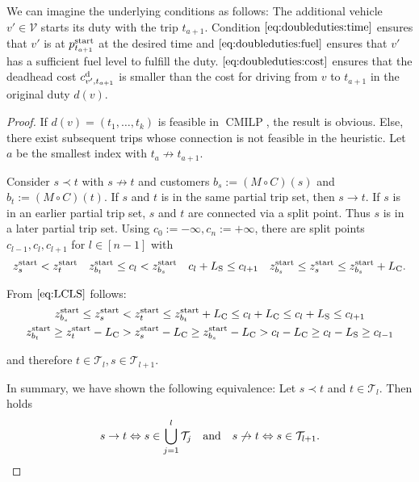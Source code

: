 We can imagine the underlying conditions as follows: The additional vehicle $v'\in\mathcal{V}$ starts its duty with the trip $t_{a+1}$. Condition $\eqref{eq:doubleduties:time}$ ensures that $v'$ is at $p^{\operatorname{start}}_{t_{a+1}}$ at the desired time and $\eqref{eq:doubleduties:fuel}$ ensures that $v'$ has a sufficient fuel level to fulfill the duty. $\eqref{eq:doubleduties:cost}$ ensures that the deadhead cost $c^{\operatorname{d}}_{v',t_{a+1}}$ is smaller than the cost for driving from $v$ to $t_{a+1}$ in the original duty $d(v)$.

\begin{proof}

If ${d(v)=\left(t_1,\dots,t_k\right)}$ is feasible in $\operatorname{CMILP}$, the result is obvious. Else, there exist subsequent trips whose connection is not feasible in the heuristic. Let $a$ be the smallest index with ${t_a\not\to t_{a+1}}$.

Consider ${s\prec t}$ with ${s\not\to t}$ and customers ${b_s:=\left(M\circ C\right)(s)}$ and ${b_t:=\left(M\circ C\right)(t)}$. If $s$ and $t$ is in the same partial trip set, then ${s\to t}$. If $s$ is in an earlier partial trip set, $s$ and $t$ are connected via a split point. Thus $s$ is in a later partial trip set. Using ${c_{0}:=-\infty}, {c_n:=+\infty}$, there are split points $c_{l-1},c_l,c_{l+1}$ for $l\in[n-1]$ with
\begin{align*}
	z^{\operatorname{start}}_s < z^{\operatorname{start}}_t && z^{\operatorname{start}}_{b_t}\leq c_l <z^{\operatorname{start}}_{b_s} && c_l+L_{\operatorname{S}}\leq c_{l+1} && z^{\operatorname{start}}_{b_s}\leq z^{\operatorname{start}}_s\leq z^{\operatorname{start}}_{b_s}+L_{\operatorname{C}}.
\end{align*}

From $\eqref{eq:LCLS}$ follows:
\begin{gather*}
	z^{\operatorname{start}}_{b_s} \leq z^{\operatorname{start}}_s < z^{\operatorname{start}}_t\leq z^{\operatorname{start}}_{b_t}+L_{\operatorname{C}} \leq c_l+L_{\operatorname{C}} \leq c_l+L_{\operatorname{S}} \leq c_{l+1} \\
	z^{\operatorname{start}}_{b_t} \geq z^{\operatorname{start}}_t-L_{\operatorname{C}} > z^{\operatorname{start}}_s-L_{\operatorname{C}} \geq z^{\operatorname{start}}_{b_s}-L_{\operatorname{C}} > c_l-L_{\operatorname{C}}\geq c_l-L_{\operatorname{S}}\geq c_{l-1}
\end{gather*}

and therefore $t\in\mathcal{T}_l,s\in\mathcal{T}_{l+1}$.

In summary, we have shown the following equivalence: Let ${s\prec t}$ and ${t\in\mathcal{T}_l}$. Then holds
\begin{align*}
	s\to t \Leftrightarrow s\in\bigcup_{j=1}^l \mathcal{T}_j && \text{and} && s\not\to t \Leftrightarrow s\in\mathcal{T}_{l+1}.
\end{align*}


\end{proof}
